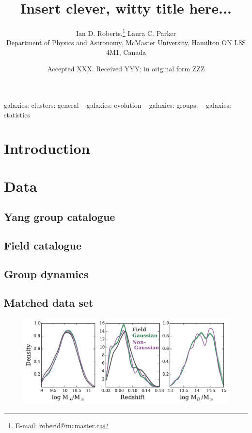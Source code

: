 \documentclass[a4paper,fleqn,usenatbib]{mnras}
\title[]{Insert clever, witty title here...}
\author[I.D. Roberts \& L.C. Parker]{
Ian D. Roberts,\thanks{E-mail: roberid@mcmaster.ca}
Laura C. Parker
\\
Department of Physics and Astronomy, McMaster University, Hamilton ON
L8S 4M1, Canada
}
\date{Accepted XXX. Received YYY; in original form ZZZ}
\begin{document}
\label{firstpage}
\pagerange{\pageref{firstpage}--\pageref{lastpage}}
\maketitle

\begin{abstract}
\end{abstract}

\begin{keywords}
galaxies: clusters: general -- galaxies: evolution -- galaxies:
groups: -- galaxies: statistics
\end{keywords}



\section{Introduction}
\label{sec:introduction}


\section{Data}
\label{sec:data}

\subsection{Yang group catalogue}

\subsection{Field catalogue}

\subsection{Group dynamics}

\subsection{Matched data set}

\begin{figure}
  \centering
  \includegraphics[width=\textwidth]{dist_m2_s.pdf}
  \caption{}
  \label{fig:dist_m2_s}
\end{figure}
\end{document}
